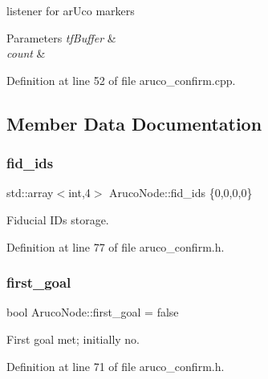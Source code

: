 listener for ar\+Uco markers 


\begin{DoxyParams}{Parameters}
{\em tf\+Buffer} & \\
\hline
{\em count} & \\
\hline
\end{DoxyParams}


Definition at line 52 of file aruco\+\_\+confirm.\+cpp.



\subsection{Member Data Documentation}
\mbox{\label{class_aruco_node_aa64bc8aad47d7569e315f5045ecaa7ac}} 
\subsubsection{\texorpdfstring{fid\+\_\+ids}{fid\_ids}}
{\footnotesize\ttfamily std\+::array$<$int,4$>$ Aruco\+Node\+::fid\+\_\+ids \{0,0,0,0\}}



Fiducial I\+Ds storage. 



Definition at line 77 of file aruco\+\_\+confirm.\+h.

\mbox{\label{class_aruco_node_a323a2a97fc30a4e6daf59d9577485569}} 
\subsubsection{\texorpdfstring{first\+\_\+goal}{first\_goal}}
{\footnotesize\ttfamily bool Aruco\+Node\+::first\+\_\+goal = false}



First goal met; initially no. 



Definition at line 71 of file aruco\+\_\+confirm.\+h.

\mbox{\label{class_aruco_node_a454cdb8d15fa07e7913887a1b2029600}} 
